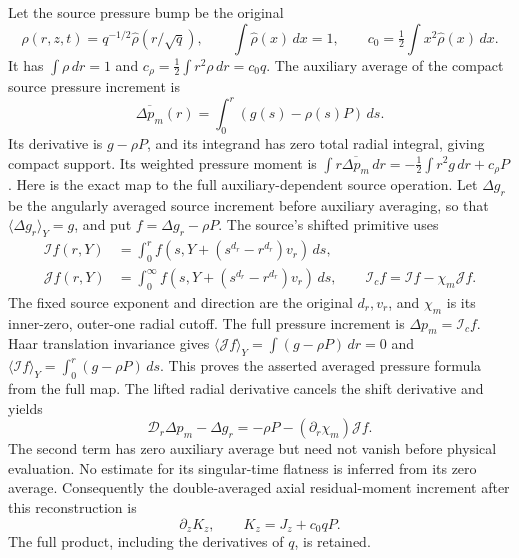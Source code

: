 Let the source pressure bump be the original
\[
 \rho(r,z,t)=q^{-1/2}\widehat\rho(r/\sqrt q),\qquad
 \int\widehat\rho(x)\,dx=1,\qquad
 c_0=\tfrac12\int x^2\widehat\rho(x)\,dx .
\]
It has \(\int\rho\,dr=1\) and
\(c_\rho=\frac12\int r^2\rho\,dr=c_0q\).
The auxiliary average of the compact source pressure increment is
\[
 \overline{\Delta p_m}(r)=\int_0^r(g(s)-\rho(s)P)\,ds .
\]
Its derivative is \(g-\rho P\), and its integrand has zero total
radial integral, giving compact support. Its weighted pressure moment is
\(\int r\overline{\Delta p_m}\,dr=-\frac12\int r^2g\,dr+c_\rho P\).
Here is the exact map to the full auxiliary-dependent source operation.
Let \(\Delta g_r\) be the angularly averaged source increment before
auxiliary averaging, so that \(\langle\Delta g_r\rangle_Y=g\), and
put \(f=\Delta g_r-\rho P\). The source's shifted primitive uses
\[
 \begin{split}
 \mathcal I f(r,Y)&=\int_0^r
       f(s,Y+(s^{d_r}-r^{d_r})v_r)\,ds,\\
 \mathcal J f(r,Y)&=\int_0^\infty
       f(s,Y+(s^{d_r}-r^{d_r})v_r)\,ds,\qquad
 \mathcal I_cf=\mathcal If-\chi_m\mathcal Jf .
 \end{split}
\]
The fixed source exponent and direction are the original \(d_r,v_r\),
and \(\chi_m\) is its inner-zero, outer-one radial cutoff. The full
pressure increment is \(\Delta p_m=\mathcal I_cf\).
Haar translation invariance gives
\(\langle\mathcal Jf\rangle_Y=\int(g-\rho P)\,dr=0\) and
\(\langle\mathcal If\rangle_Y=\int_0^r(g-\rho P)\,ds\).
This proves the asserted averaged pressure formula from the full map.
The lifted radial derivative cancels the shift derivative and yields
\[
 \mathcal D_r\Delta p_m-\Delta g_r
       =-\rho P-(\partial_r\chi_m)\mathcal Jf .
\]
The second term has zero auxiliary average but need not vanish before
physical evaluation. No estimate for its singular-time flatness is
inferred from its zero average.
Consequently the double-averaged axial residual-moment increment after
this reconstruction is
\[
 \partial_zK_z,\qquad K_z=J_z+c_0qP .
\]
The full product, including the derivatives of \(q\), is retained.

